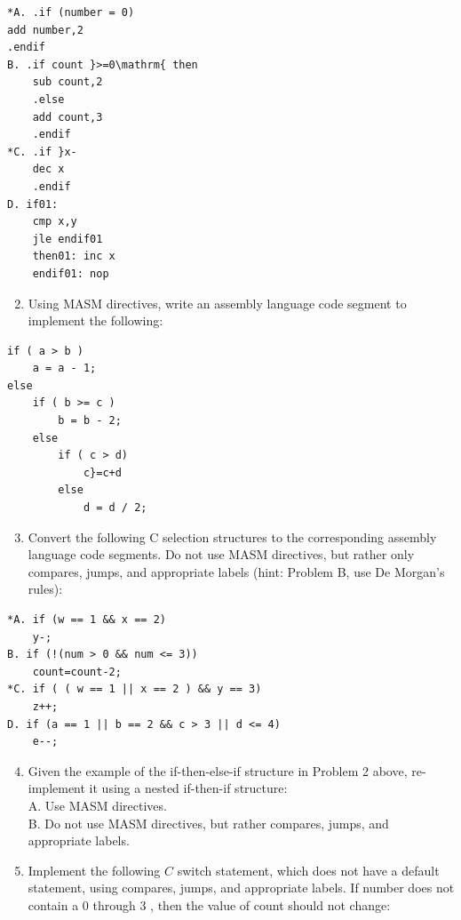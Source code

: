 \documentclass[10pt]{article}
\begin{document}
\begin{verbatim}
*A. .if (number = 0)
add number,2
.endif
B. .if count }>=0\mathrm{ then
    sub count,2
    .else
    add count,3
    .endif
*C. .if }x-
    dec x
    .endif
D. if01:
    cmp x,y
    jle endif01
    then01: inc x
    endif01: nop
\end{verbatim}

\begin{enumerate}
  \setcounter{enumi}{1}
  \item Using MASM directives, write an assembly language code segment to implement the following:
\end{enumerate}

\begin{verbatim}
if ( a > b )
    a = a - 1;
else
    if ( b >= c )
        b = b - 2;
    else
        if ( c > d)
            c}=c+d
        else
            d = d / 2;
\end{verbatim}

\begin{enumerate}
  \setcounter{enumi}{2}
  \item Convert the following C selection structures to the corresponding assembly language code segments. Do not use MASM directives, but rather only compares, jumps, and appropriate labels (hint: Problem B, use De Morgan's rules):
\end{enumerate}

\begin{verbatim}
*A. if (w == 1 && x == 2)
    y-;
B. if (!(num > 0 && num <= 3))
    count=count-2;
*C. if ( ( w == 1 || x == 2 ) && y == 3)
    z++;
D. if (a == 1 || b == 2 && c > 3 || d <= 4)
    e--;
\end{verbatim}

\begin{enumerate}
  \setcounter{enumi}{3}
  \item Given the example of the if-then-else-if structure in Problem 2 above, re-implement it using a nested if-then-if structure:\\
A. Use MASM directives.\\
B. Do not use MASM directives, but rather compares, jumps, and appropriate labels.
  \item Implement the following $C$ switch statement, which does not have a default statement, using compares, jumps, and appropriate labels. If number does not contain a 0 through 3 , then the value of count should not change:
\end{enumerate}
\end{document}
